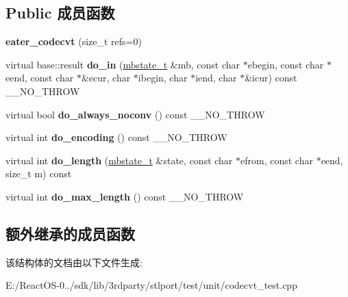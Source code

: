 \subsection*{Public 成员函数}
\begin{DoxyCompactItemize}
\item 
\mbox{\label{structeater__codecvt_af2a014b3d8e3bdd3541576bcb65cc50c}} 
{\bfseries eater\+\_\+codecvt} (size\+\_\+t refs=0)
\item 
\mbox{\label{structeater__codecvt_a04c5073fa6840f77c2c17fdb46b2b26c}} 
virtual base\+::result {\bfseries do\+\_\+in} (\hyperlink{struct____mbstate__t}{mbstate\+\_\+t} \&mb, const char $\ast$ebegin, const char $\ast$eend, const char $\ast$\&ecur, char $\ast$ibegin, char $\ast$iend, char $\ast$\&icur) const \+\_\+\+\_\+\+N\+O\+\_\+\+T\+H\+R\+OW
\item 
\mbox{\label{structeater__codecvt_a12400fcfdb86076cea5ae7ada5eec9a0}} 
virtual bool {\bfseries do\+\_\+always\+\_\+noconv} () const \+\_\+\+\_\+\+N\+O\+\_\+\+T\+H\+R\+OW
\item 
\mbox{\label{structeater__codecvt_a6c2dfc9a9ea57fd42c68e4fc54a0222c}} 
virtual int {\bfseries do\+\_\+encoding} () const \+\_\+\+\_\+\+N\+O\+\_\+\+T\+H\+R\+OW
\item 
\mbox{\label{structeater__codecvt_a74a58ae4e2b5b06faa3bc6db16f82a1e}} 
virtual int {\bfseries do\+\_\+length} (\hyperlink{struct____mbstate__t}{mbstate\+\_\+t} \&state, const char $\ast$efrom, const char $\ast$eend, size\+\_\+t m) const
\item 
\mbox{\label{structeater__codecvt_a520125db71da101079d0ce6ed97718d0}} 
virtual int {\bfseries do\+\_\+max\+\_\+length} () const \+\_\+\+\_\+\+N\+O\+\_\+\+T\+H\+R\+OW
\end{DoxyCompactItemize}
\subsection*{额外继承的成员函数}


该结构体的文档由以下文件生成\+:\begin{DoxyCompactItemize}
\item 
E\+:/\+React\+O\+S-\/0../sdk/lib/3rdparty/stlport/test/unit/codecvt\+\_\+test.\+cpp\end{DoxyCompactItemize}
